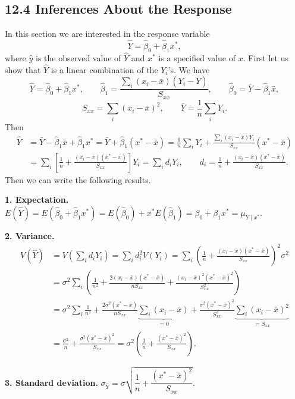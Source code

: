 \subsection*{12.4 Inferences About the Response}

In this section we are interested in the response variable
\[
\hat{Y}=\hat\beta_0+\hat\beta_1x^*,
\]
where $\hat{y}$ is the observed value of $\hat{Y}$ and $x^*$ is a specified value of $x$.
First let us show that $\hat{Y}$ is a linear combination of the $Y_i$'s. We have
\[
\hat{Y}=\hat\beta_0+\hat\beta_1x^*,\qquad
\hat\beta_1=\frac{\sum_i(x_i-\bar{x})(Y_i-\bar{Y})}{S_{xx}},\qquad
\hat\beta_0=\bar{Y}-\hat\beta_1\bar{x},
\]
\[
S_{xx}=\sum_i(x_i-\bar{x})^2,\qquad
\bar{Y}=\frac{1}{n}\sum_i Y_i .
\]
Then
\begin{align*}
\hat{Y} &= \bar{Y}-\hat\beta_1\bar{x}+\hat\beta_1x^* = \bar{Y}+\hat\beta_1(x^*-\bar{x})
= \frac{1}{n}\sum_i Y_i+\frac{\sum_i(x_i-\bar{x})Y_i}{S_{xx}}(x^*-\bar{x})\\
&= \sum_i\left[\frac{1}{n}+\frac{(x_i-\bar{x})(x^*-\bar{x})}{S_{xx}}\right]Y_i=\sum_i d_iY_i,
\qquad d_i=\frac{1}{n}+\frac{(x_i-\bar{x})(x^*-\bar{x})}{S_{xx}} .
\end{align*}
Then we can write the following results.

\textbf{1. Expectation.} $E(\hat{Y})=E(\hat\beta_0+\hat\beta_1x^*)=E(\hat\beta_0)+x^*E(\hat\beta_1)=\beta_0+\beta_1x^*=\mu_{Y\mid x^*}$.

\textbf{2. Variance.}
\begin{align*}
V(\hat{Y}) &= V\!\left(\sum_i d_iY_i\right)=\sum_i d_i^2V(Y_i)
=\sum_i\left(\frac{1}{n}+\frac{(x_i-\bar{x})(x^*-\bar{x})}{S_{xx}}\right)^2\sigma^2\\
&=\sigma^2\sum_i\left(\frac{1}{n^2}+\frac{2(x_i-\bar{x})(x^*-\bar{x})}{nS_{xx}}+\frac{(x_i-\bar{x})^2(x^*-\bar{x})^2}{S_{xx}^2}\right)\\
&=\sigma^2\sum_i\frac{1}{n^2}+\frac{2\sigma^2(x^*-\bar{x})}{nS_{xx}}\underbrace{\sum_i(x_i-\bar{x})}_{=0}+\frac{\sigma^2(x^*-\bar{x})^2}{S_{xx}^2}\underbrace{\sum_i(x_i-\bar{x})^2}_{=S_{xx}}\\
&=\frac{\sigma^2}{n}+\frac{\sigma^2(x^*-\bar{x})^2}{S_{xx}}=\sigma^2\left(\frac{1}{n}+\frac{(x^*-\bar{x})^2}{S_{xx}}\right).
\end{align*}

\textbf{3. Standard deviation.} $\sigma_{\hat{Y}}=\sigma\sqrt{\dfrac{1}{n}+\dfrac{(x^*-\bar{x})^2}{S_{xx}}}$.

